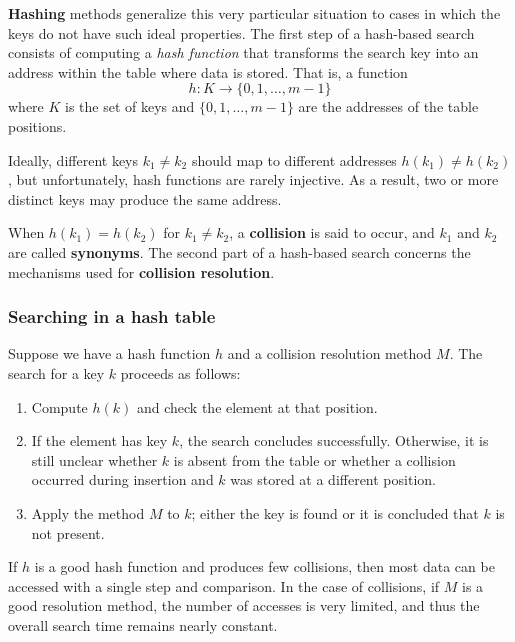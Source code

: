 \documentclass{report}
\begin{document}
\textbf{Hashing} methods generalize this very particular situation to cases in which the keys do not have such ideal properties. The first step of a hash-based search consists of computing a \textit{hash function} that transforms the search key into an address within the table where data is stored. That is, a function
\[
h : K \rightarrow \{0, 1, \dots, m - 1\}
\]
where $K$ is the set of keys and $\{0, 1, \dots, m - 1\}$ are the addresses of the table positions.

Ideally, different keys $k_1 \ne k_2$ should map to different addresses $h(k_1) \ne h(k_2)$, but unfortunately, hash functions are rarely injective. As a result, two or more distinct keys may produce the same address.

When $h(k_1) = h(k_2)$ for $k_1 \ne k_2$, a {\textbf{collision}} is said to occur, and $k_1$ and $k_2$ are called {\textbf{synonyms}}. The second part of a hash-based search concerns the mechanisms used for \textbf{collision resolution}.

\subsubsection{Searching in a hash table}
Suppose we have a hash function $h$ and a collision resolution method $M$. The search for a key $k$ proceeds as follows:

\begin{enumerate}
    \item Compute $h(k)$ and check the element at that position.
    \item If the element has key $k$, the search concludes successfully. Otherwise, it is still unclear whether $k$ is absent from the table or whether a collision occurred during insertion and $k$ was stored at a different position.
    \item Apply the method $M$ to $k$; either the key is found or it is concluded that $k$ is not present.
\end{enumerate}
\noindent
If $h$ is a good hash function and produces few collisions, then most data can be accessed with a single step and comparison. In the case of collisions, if $M$ is a good resolution method, the number of accesses is very limited, and thus the overall search time remains nearly constant.
\end{document}
